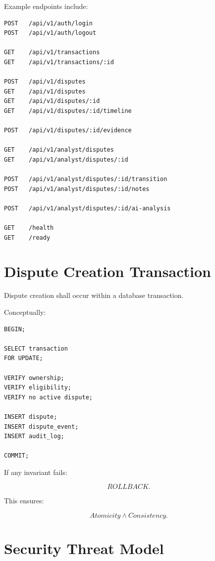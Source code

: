 \documentclass[11pt,a4paper]{article}
\begin{document}
Example endpoints include:

\begin{lstlisting}
POST   /api/v1/auth/login
POST   /api/v1/auth/logout

GET    /api/v1/transactions
GET    /api/v1/transactions/:id

POST   /api/v1/disputes
GET    /api/v1/disputes
GET    /api/v1/disputes/:id
GET    /api/v1/disputes/:id/timeline

POST   /api/v1/disputes/:id/evidence

GET    /api/v1/analyst/disputes
GET    /api/v1/analyst/disputes/:id

POST   /api/v1/analyst/disputes/:id/transition
POST   /api/v1/analyst/disputes/:id/notes

POST   /api/v1/analyst/disputes/:id/ai-analysis

GET    /health
GET    /ready
\end{lstlisting}

\section{Dispute Creation Transaction}

Dispute creation shall occur within a database transaction.

Conceptually:

\begin{lstlisting}
BEGIN;

SELECT transaction
FOR UPDATE;

VERIFY ownership;
VERIFY eligibility;
VERIFY no active dispute;

INSERT dispute;
INSERT dispute_event;
INSERT audit_log;

COMMIT;
\end{lstlisting}

If any invariant fails:

\[
ROLLBACK.
\]

This ensures:

\[
Atomicity
\land
Consistency.
\]

\section{Security Threat Model}
\end{document}
